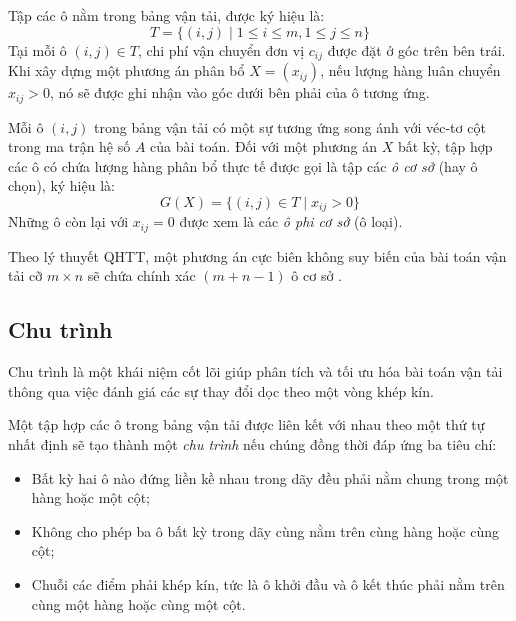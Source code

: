 \documentclass[../main.tex]{subfiles}
\begin{document}
\begin{figure}[H]
\end{figure}
Tập các ô nằm trong bảng vận tải, được ký hiệu là:
\[ T = \{(i,j) \mid 1 \le i \le m, 1 \le j \le n\} \]
Tại mỗi ô $(i,j) \in T$, chi phí vận chuyển đơn vị $c_{ij}$ được đặt ở góc trên bên trái. Khi xây dựng một phương án phân bổ $X = (x_{ij})$, nếu lượng hàng luân chuyển $x_{ij} > 0$, nó sẽ được ghi nhận vào góc dưới bên phải của ô tương ứng.

Mỗi ô $(i,j)$ trong bảng vận tải có một sự tương ứng song ánh với véc-tơ cột trong ma trận hệ số $A$ của bài toán. Đối với một phương án $X$ bất kỳ, tập hợp các ô có chứa lượng hàng phân bổ thực tế được gọi là tập các \textit{ô cơ sở} (hay ô chọn), ký hiệu là:
\[ G(X) = \{(i,j) \in T \mid x_{ij} > 0\} \]
Những ô còn lại với $x_{ij} = 0$ được xem là các \textit{ô phi cơ sở} (ô loại).

Theo lý thuyết QHTT, một phương án cực biên không suy biến của bài toán vận tải cỡ $m \times n$ sẽ chứa chính xác $(m+n-1)$ ô cơ sở \cite{bachkim}.

\subsection{Chu trình}
Chu trình là một khái niệm cốt lõi giúp phân tích và tối ưu hóa bài toán vận tải thông qua việc đánh giá các sự thay đổi dọc theo một vòng khép kín.

\begin{definition}
    Một tập hợp các ô trong bảng vận tải được liên kết với nhau theo một thứ tự nhất định sẽ tạo thành một \textit{chu trình} nếu chúng đồng thời đáp ứng ba tiêu chí:
    \begin{itemize}
        \item[i)] Bất kỳ hai ô nào đứng liền kề nhau trong dãy đều phải nằm chung trong một hàng hoặc một cột;
        \item[ii)] Không cho phép ba ô bất kỳ trong dãy cùng nằm trên cùng hàng hoặc cùng cột;
        \item[iii)] Chuỗi các điểm phải khép kín, tức là ô khởi đầu và ô kết thúc phải nằm trên cùng một hàng hoặc cùng một cột.
    \end{itemize}
\end{definition}
\end{document}
